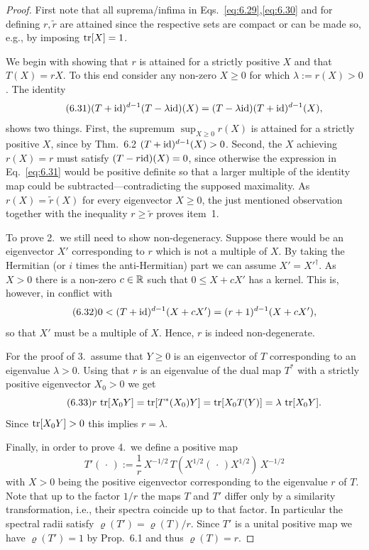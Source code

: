 \documentclass[11pt,a4paper]{article}
\theoremstyle{plain}
\theoremstyle{definition}
\theoremstyle{remark}
\begin{document}
\begin{proof}
    First note that all suprema/infima in Eqs.~\eqref{eq:6.29},\eqref{eq:6.30} and for
    defining $r,\tilde r$ are attained since the respective sets are compact or can be
    made so, e.g., by imposing $\operatorname{tr}[X]=1$.

    We begin with showing that $r$ is attained for a strictly positive $X$ and that
    $T(X)=rX$. To this end consider any non-zero $X\ge 0$ for which $\lambda:=r(X)>0$.
    The identity
    \begin{equation}\tag{6.31}\label{eq:6.31}
        (T+\mathrm{id})^{d-1}(T-\lambda\mathrm{id})(X) = (T-\lambda\mathrm{id})(T+\mathrm{id})^{d-1}(X),
    \end{equation}
    shows two things. First, the supremum $\sup_{X\ge 0} r(X)$ is attained for a strictly
    positive $X$, since by Thm.~6.2 $(T+\mathrm{id})^{d-1}(X)>0$. Second, the $X$ achieving
    $r(X)=r$ must satisfy $(T-r\mathrm{id})(X)=0$, since otherwise the expression in
    Eq.~\eqref{eq:6.31} would be positive definite so that a larger multiple of the identity
    map could be subtracted---contradicting the supposed maximality. As $r(X)=\tilde r(X)$
    for every eigenvector $X\ge 0$, the just mentioned observation together with the
    inequality $r\ge \tilde r$ proves item~1.

    To prove 2.\ we still need to show non-degeneracy. Suppose there would be an
    eigenvector $X'$ corresponding to $r$ which is not a multiple of $X$. By taking the
    Hermitian (or $i$ times the anti-Hermitian) part we can assume $X'=X'^\dagger$.
    As $X>0$ there is a non-zero $c\in\mathbb{R}$ such that $0\le X+cX'$ has a kernel. This is,
    however, in conflict with
    \begin{equation}\tag{6.32}\label{eq:6.32}
        0 < (T+\mathrm{id})^{d-1}(X+cX') = (r+1)^{d-1}(X+cX'),
    \end{equation}
    so that $X'$ must be a multiple of $X$. Hence, $r$ is indeed non-degenerate.

    For the proof of 3.\ assume that $Y\ge 0$ is an eigenvector of $T$ corresponding to
    an eigenvalue $\lambda>0$. Using that $r$ is an eigenvalue of the dual map $T^*$ with a
    strictly positive eigenvector $X_0>0$ we get
    \begin{equation}\tag{6.33}\label{eq:6.33}
        r\,\operatorname{tr}[X_0Y] = \operatorname{tr}[T^*(X_0)Y] = \operatorname{tr}[X_0T(Y)] = \lambda\,\operatorname{tr}[X_0Y].
    \end{equation}
    Since $\operatorname{tr}[X_0Y]>0$ this implies $r=\lambda$.

    Finally, in order to prove 4.\ we define a positive map
    \[
        T'(\,\cdot\,)
        := \frac{1}{r}\,X^{-1/2}\,T\!(X^{1/2}(\,\cdot\,)X^{1/2})\,X^{-1/2}
    \]
    with $X>0$ being the positive eigenvector corresponding to the eigenvalue $r$ of $T$.
    Note that up to the factor $1/r$ the maps $T$ and $T'$ differ only by a similarity
    transformation, i.e., their spectra coincide up to that factor. In particular the
    spectral radii satisfy $\varrho(T')=\varrho(T)/r$. Since $T'$ is a unital positive map
    we have $\varrho(T')=1$ by Prop.~6.1 and thus $\varrho(T)=r$.
\end{proof}
\end{document}
